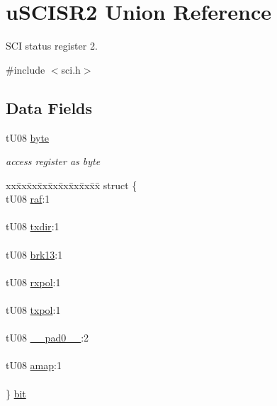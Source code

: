 \hypertarget{unionu_s_c_i_s_r2}{}\section{u\+S\+C\+I\+S\+R2 Union Reference}
\label{unionu_s_c_i_s_r2}


S\+C\+I status register 2.  




{\ttfamily \#include $<$sci.\+h$>$}

\subsection*{Data Fields}
\begin{DoxyCompactItemize}
\item 
\hypertarget{unionu_s_c_i_s_r2_aba308d63db050aed25cfd36c37e41ad4}{}t\+U08 \hyperlink{unionu_s_c_i_s_r2_aba308d63db050aed25cfd36c37e41ad4}{byte}\label{unionu_s_c_i_s_r2_aba308d63db050aed25cfd36c37e41ad4}

\begin{DoxyCompactList}\small\item\em access register as byte \end{DoxyCompactList}\item 
\hypertarget{unionu_s_c_i_s_r2_a4a5e5106c1a982d3b3da50d7d0877860}{}\begin{tabbing}
xx\=xx\=xx\=xx\=xx\=xx\=xx\=xx\=xx\=\kill
struct \{\\
\>tU08 \hyperlink{unionu_s_c_i_s_r2_a9f7b81b547ebe99f6c31a433b5eb0157}{raf}:1\\
\>\\
\>tU08 \hyperlink{unionu_s_c_i_s_r2_afbe7b35de0dd7d74bc26c4f53fcc7b98}{txdir}:1\\
\>\\
\>tU08 \hyperlink{unionu_s_c_i_s_r2_acf6e6c6a8f4b7d09112847d78ba5849a}{brk13}:1\\
\>\\
\>tU08 \hyperlink{unionu_s_c_i_s_r2_acef6f5ecbf90b18e759ea97ed6587efb}{rxpol}:1\\
\>\\
\>tU08 \hyperlink{unionu_s_c_i_s_r2_a4933c595a9b2d8f312365432953e5957}{txpol}:1\\
\>\\
\>tU08 \hyperlink{unionu_s_c_i_s_r2_aa3e5250d311ceb1525f9adf38f0d7982}{\_\_pad0\_\_}:2\\
\>\\
\>tU08 \hyperlink{unionu_s_c_i_s_r2_a8be57af5fe306b2e7a96e5ba3a916a92}{amap}:1\\
\>\\
\} \hyperlink{unionu_s_c_i_s_r2_a4a5e5106c1a982d3b3da50d7d0877860}{bit}\label{unionu_s_c_i_s_r2_a4a5e5106c1a982d3b3da50d7d0877860}
\\


\end{tabbing}
\end{DoxyCompactItemize}
